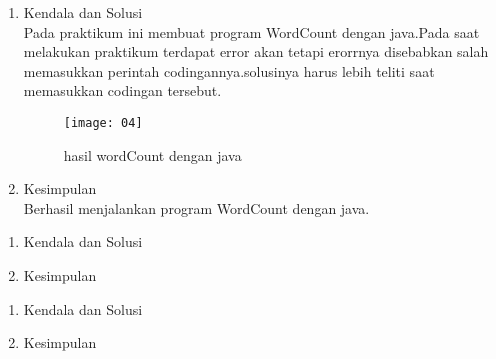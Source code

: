 \begin{enumerate}
\item Kendala dan Solusi\\
Pada praktikum ini membuat program WordCount dengan java.Pada saat melakukan praktikum terdapat error akan tetapi erorrnya disebabkan salah memasukkan perintah codingannya.solusinya harus lebih teliti saat memasukkan codingan tersebut.

\begin{figure}[!ht]
\texttt{[image: 04]}
\caption{hasil wordCount dengan java}
\label{gam:perkuliahan-25-11}
\end{figure}

\item Kesimpulan\\
Berhasil menjalankan program WordCount dengan java.

\end{enumerate}

\begin{enumerate}
\item Kendala dan Solusi

\item Kesimpulan

\end{enumerate}

\begin{enumerate}
\item Kendala dan Solusi

\item Kesimpulan

\end{enumerate}